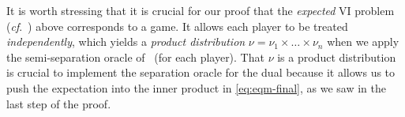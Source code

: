 It is worth stressing that it is crucial for our proof that the \emph{expected} VI problem (\emph{cf}.~\citet{Zhang25:Expected}) above corresponds to a game. It allows each player to be treated {\em independently}, which yields a {\em product distribution} $\nu = \nu_1 \times \dots \times \nu_n$ when we apply the semi-separation oracle of~ (for each player). That $\nu$ is a product distribution is crucial to implement the separation oracle for the dual because it allows us to push the expectation into the inner product in \eqref{eq:eqm-final}, as we saw in the last step of the proof.

